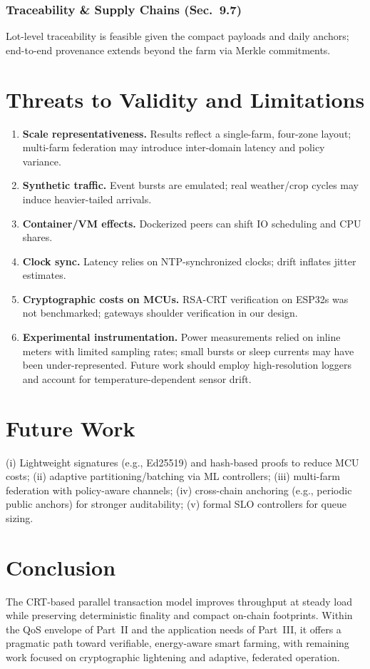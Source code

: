 \subsubsection{Traceability \& Supply Chains (Sec.~9.7)}
Lot-level traceability is feasible given the compact payloads and daily anchors; end-to-end provenance extends beyond the farm via Merkle commitments.

\section{Threats to Validity and Limitations}
\begin{enumerate}
  \item \textbf{Scale representativeness.} Results reflect a single-farm, four-zone layout; multi-farm federation may introduce inter-domain latency and policy variance.
  \item \textbf{Synthetic traffic.} Event bursts are emulated; real weather/crop cycles may induce heavier-tailed arrivals.
  \item \textbf{Container/VM effects.} Dockerized peers can shift IO scheduling and CPU shares.
  \item \textbf{Clock sync.} Latency relies on NTP-synchronized clocks; drift inflates jitter estimates.
  \item \textbf{Cryptographic costs on MCUs.} RSA-CRT verification on ESP32s was not benchmarked; gateways shoulder verification in our design.
  \item \textbf{Experimental instrumentation.} Power measurements relied on inline meters with limited sampling rates; small bursts or sleep currents may have been under-represented.  Future work should employ high-resolution loggers and account for temperature-dependent sensor drift.
\end{enumerate}

\section{Future Work}
(i) Lightweight signatures (e.g., Ed25519) and hash-based proofs to reduce MCU costs; (ii) adaptive partitioning/batching via ML controllers; (iii) multi-farm federation with policy-aware channels; (iv) cross-chain anchoring (e.g., periodic public anchors) for stronger auditability; (v) formal SLO controllers for queue sizing.

\section{Conclusion}
The CRT-based parallel transaction model improves throughput at steady load while preserving deterministic finality and compact on-chain footprints. Within the QoS envelope of Part~II and the application needs of Part~III, it offers a pragmatic path toward verifiable, energy-aware smart farming, with remaining work focused on cryptographic lightening and adaptive, federated operation.

